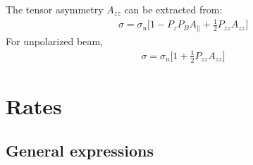 \documentclass[11pt]{article}
\begin{document}

%
\pagestyle{plain}

The tensor asymmetry $A_{zz}$ can be extracted from:
\begin{eqnarray}
\sigma = \sigma_u \bigg[1 - P_z P_B A_{\parallel} + \frac{1}{2} P_{zz} A_{zz}\bigg]
\label{xs} 
\end{eqnarray}
For unpolarized beam, 
\begin{eqnarray}
\sigma = \sigma_u \bigg[1 + \frac{1}{2} P_{zz} A_{zz}\bigg]
\label{xsbis} 
\end{eqnarray}

\section{Rates}

\subsection{General expressions}
\end{document}
